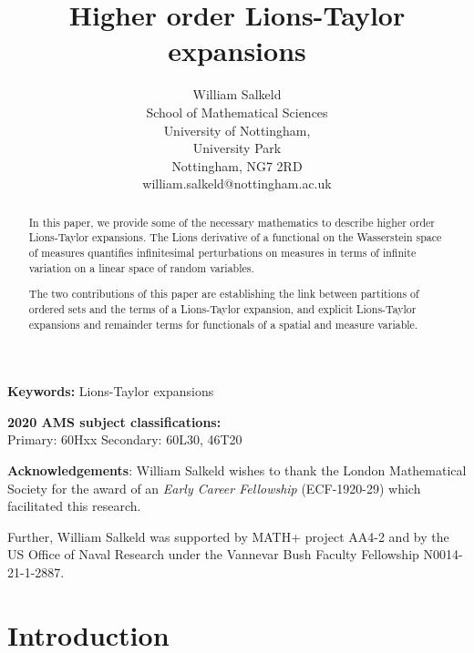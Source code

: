 \documentclass[a4paper,11pt,twoside]{article}
\author{
	William Salkeld \\[8pt]
	\small School of Mathematical Sciences \\
	\small University of Nottingham, \\
	\small University Park \\
	\small Nottingham, NG7 2RD \\
	\small  william.salkeld@nottingham.ac.uk
}
\title{Higher order Lions-Taylor expansions}
\numberwithin{equation}{section}
\theoremstyle{plain}
\newcommand{\1}{\mathbbm{1}}
\begin{document}
	
	\maketitle
	
	\begin{abstract} 
		In this paper, we provide some of the necessary mathematics to describe higher order Lions-Taylor expansions. The Lions derivative of a functional on the Wasserstein space of measures quantifies infinitesimal perturbations on measures in terms of infinite variation on a linear space of random variables. 
		
		The two contributions of this paper are establishing the link between partitions of ordered sets and the terms of a Lions-Taylor expansion, and explicit Lions-Taylor expansions and remainder terms for functionals of a spatial and measure variable. 
	\end{abstract} 
	
	
	{\bf Keywords:} Lions-Taylor expansions
	
	\vspace{0.3cm}
	
	\noindent
	{\bf 2020 AMS subject classifications:}\\
	Primary: 60Hxx 
	\quad
	Secondary: 60L30, 46T20
	
	
	\noindent
	{\bf Acknowledgements}: William Salkeld wishes to thank the London Mathematical Society for the award of an \emph{Early Career Fellowship} (ECF-1920-29) which facilitated this research.
	
	Further, William Salkeld was supported by MATH+ project AA4-2 and by the US Office of Naval Research under the Vannevar Bush Faculty Fellowship N0014-21-1-2887.  
	
	\setcounter{tocdepth}{2}
	\tableofcontents
	\newpage
	
	\section{Introduction}
	
\end{document}
